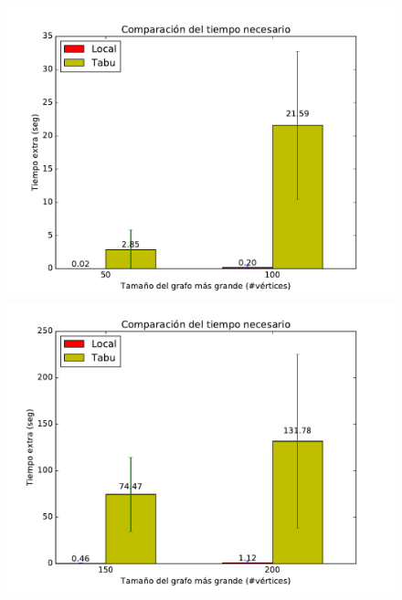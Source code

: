 \begin{figure}[H]
\centering
\begin{minipage}{0.49\textwidth}
  \centering
    \includegraphics[width=1\textwidth]{graficos/problema_7/tiempo0.pdf}
  \caption{}
  \label{fig:7-tiempo1}
\end{minipage}%
\hspace{0.01\textwidth}
\begin{minipage}{0.49\textwidth}   
  \centering
    \includegraphics[width=1\textwidth]{graficos/problema_7/tiempo2.pdf} 
  \caption{}
  \label{fig:7-tiempo2}
\end{minipage}


\end{figure}
